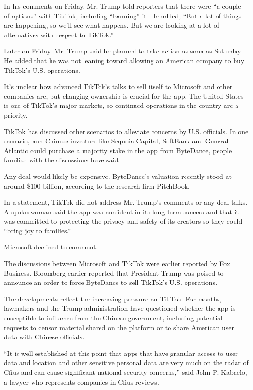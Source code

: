 In his comments on Friday, Mr. Trump told reporters that there were ``a
couple of options'' with TikTok, including ``banning'' it. He added,
``But a lot of things are happening, so we'll see what happens. But we
are looking at a lot of alternatives with respect to TikTok.''

Later on Friday, Mr. Trump said he planned to take action as soon as
Saturday. He added that he was not leaning toward allowing an American
company to buy TikTok's U.S. operations.

It's unclear how advanced TikTok's talks to sell itself to Microsoft and
other companies are, but changing ownership is crucial for the app. The
United States is one of TikTok's major markets, so continued operations
in the country are a priority.

TikTok has discussed other scenarios to alleviate concerns by U.S.
officials. In one scenario, non-Chinese investors like Sequoia Capital,
SoftBank and General Atlantic could
\href{https://www.nytimes.com/2020/07/23/business/dealbook/tiktok-bytedance-investors-trump.html}{purchase
a majority stake in the app from ByteDance}, people familiar with the
discussions have said.

Any deal would likely be expensive. ByteDance's valuation recently stood
at around \$100 billion, according to the research firm PitchBook.

In a statement, TikTok did not address Mr. Trump's comments or any deal
talks. A spokeswoman said the app was confident in its long-term success
and that it was committed to protecting the privacy and safety of its
creators so they could ``bring joy to families.''

Microsoft declined to comment.

The discussions between Microsoft and TikTok were earlier reported by
Fox Business. Bloomberg earlier reported that President Trump was poised
to announce an order to force ByteDance to sell TikTok's U.S.
operations.

The developments reflect the increasing pressure on TikTok. For months,
lawmakers and the Trump administration have questioned whether the app
is susceptible to influence from the Chinese government, including
potential requests to censor material shared on the platform or to share
American user data with Chinese officials.

``It is well established at this point that apps that have granular
access to user data and location and other sensitive personal data are
very much on the radar of Cfius and can cause significant national
security concerns,'' said John P. Kabaelo, a lawyer who represents
companies in Cfius reviews.

